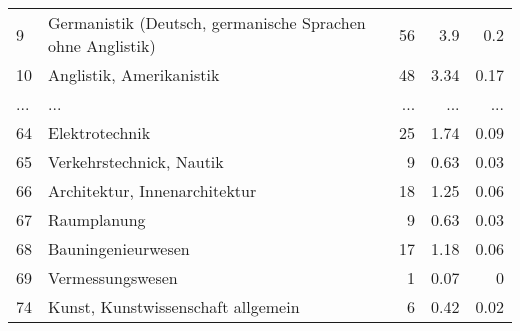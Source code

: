 \begin{longtable}{lXrrr}
        9 & \multicolumn{1}{X}{Germanistik (Deutsch, germanische Sprachen ohne Anglistik)} & %
          \num{56} &
          \num[round-mode=places,round-precision=2]{3.9} &
          \num[round-mode=places,round-precision=2]{0.2} \\
        10 & \multicolumn{1}{X}{Anglistik, Amerikanistik} & %
          \num{48} &
          \num[round-mode=places,round-precision=2]{3.34} &
          \num[round-mode=places,round-precision=2]{0.17} \\
       ... & ... & ... & ... & ... \\
        64 & \multicolumn{1}{X}{Elektrotechnik} & %
          \num{25} &
          \num[round-mode=places,round-precision=2]{1.74} &
          \num[round-mode=places,round-precision=2]{0.09} \\

        65 & \multicolumn{1}{X}{Verkehrstechnick, Nautik} & %
          \num{9} &
          \num[round-mode=places,round-precision=2]{0.63} &
          \num[round-mode=places,round-precision=2]{0.03} \\

        66 & \multicolumn{1}{X}{Architektur, Innenarchitektur} & %
          \num{18} &
          \num[round-mode=places,round-precision=2]{1.25} &
          \num[round-mode=places,round-precision=2]{0.06} \\

        67 & \multicolumn{1}{X}{Raumplanung} & %
          \num{9} &
          \num[round-mode=places,round-precision=2]{0.63} &
          \num[round-mode=places,round-precision=2]{0.03} \\

        68 & \multicolumn{1}{X}{Bauningenieurwesen} & %
          \num{17} &
          \num[round-mode=places,round-precision=2]{1.18} &
          \num[round-mode=places,round-precision=2]{0.06} \\

        69 & \multicolumn{1}{X}{Vermessungswesen} & %
          \num{1} &
          \num[round-mode=places,round-precision=2]{0.07} &
          \num[round-mode=places,round-precision=2]{0} \\

        74 & \multicolumn{1}{X}{Kunst, Kunstwissenschaft allgemein} & %
          \num{6} &
          \num[round-mode=places,round-precision=2]{0.42} &
          \num[round-mode=places,round-precision=2]{0.02} \\


\end{longtable}
